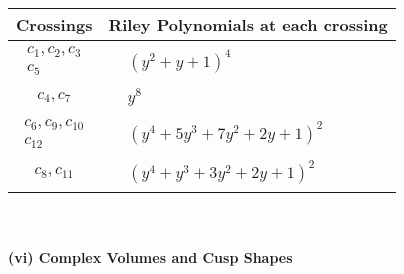 \documentclass[1p]{elsarticle_modified}
\theoremstyle{definition}
\begin{document}
\begin{tabular}{m{50pt}|m{274pt}}
Crossings & \hspace{64pt}Riley Polynomials at each crossing \\
\hline $$\begin{aligned}c_{1},c_{2},c_{3}\\c_{5}\end{aligned}$$&$\begin{aligned}
&(y^2+y+1)^4
\end{aligned}$\\
\hline $$\begin{aligned}c_{4},c_{7}\end{aligned}$$&$\begin{aligned}
&y^8
\end{aligned}$\\
\hline $$\begin{aligned}c_{6},c_{9},c_{10}\\c_{12}\end{aligned}$$&$\begin{aligned}
&(y^4+5 y^3+7 y^2+2 y+1)^2
\end{aligned}$\\
\hline $$\begin{aligned}c_{8},c_{11}\end{aligned}$$&$\begin{aligned}
&(y^4+y^3+3 y^2+2 y+1)^2
\end{aligned}$\\
\hline
\end{tabular}\\~\\
\newpage\flushleft \textbf{(vi) Complex Volumes and Cusp Shapes}
\end{document}
